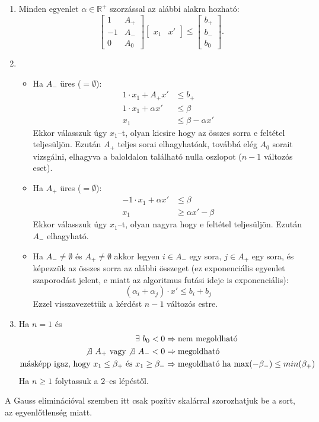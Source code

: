 \begin{enumerate}
  \item Minden egyenlet $\alpha \in \mathbb{R}^+$ szorzással az alábbi alakra
  hozható:
  \begin{displaymath}
  \begin{bmatrix}
  1  & A_+ \\
  -1 & A_- \\
  0  & A_0
  \end{bmatrix}
  \begin{bmatrix}
  x_1 & 
  x'
  \end{bmatrix}
  \leq
  \begin{bmatrix}
  b_+ \\
  b_- \\
  b_0
  \end{bmatrix}.
  \end{displaymath}
  \item 
  \begin{itemize}
  	\item Ha $A_-$ üres ($=\emptyset$): 
  	\begin{align*}
  	1 \cdot x_1 + A_+ x'     &\leq b_+ \\
  	1 \cdot x_1 + \alpha x' &\leq \beta \\
  	x_1 			  &\leq \beta - \alpha x' 
  	\end{align*} 
    Ekkor válasszuk úgy $x_1$--t, olyan kicsire hogy az összes sorra e feltétel
    teljesüljön. Ezután $A_+$ teljes sorai elhagyhatóak, továbbá elég $A_0$
    sorait vizsgálni, elhagyva a baloldalon található nulla oszlopot ($n-1$
    változós eset).
  	
  	\item Ha $A_+$ üres ($=\emptyset$): 
  	\begin{align*}
  	-1 \cdot x_1 + \alpha x'     &\leq \beta \\
  	x_1 			  &\geq \alpha x' - \beta 
  	\end{align*} 
  	Ekkor válasszuk úgy $x_1$--t, olyan nagyra hogy e feltétel teljesüljön.
  	Ezután $A_-$ elhagyható.
  	\item Ha $A_- \neq \emptyset$ és $A_+ \neq \emptyset$ akkor legyen 
  	$i \in A_-$ egy sora, $j \in A_+$ egy sora, és képezzük az összes sorra az
  	alábbi összeget (ez exponenciális egyenlet szaporodást jelent, e miatt az
  	algoritmus futási ideje is exponenciális):
  	\[
  	\left( \alpha_i + \alpha_j \right) \cdot x' \leq b_i + b_j 
  	\]
  	Ezzel visszavezettük a kérdést $n-1$ változós estre.
  \end{itemize}
 \item Ha $n=1$ és 
 \begin{align*}
 \exists~b_0 < 0 &\Rightarrow \mbox{nem megoldható} \\
 \not \exists~A_+ \mbox{ vagy} \not \exists~A_- < 0 &\Rightarrow \mbox{megoldható} \\
 \mbox{másképp igaz, hogy } x_1 \leq \beta_+ \mbox{ és } x_1 \geq \beta_-
 &\Rightarrow \mbox{megoldható ha } \mbox{max}(-\beta_-) \leq min(\beta_+)
 \end{align*} 
  Ha $n \geq 1$ folytassuk a $2$--es lépéstől.
\end{enumerate} 

A Gauss eliminációval szemben itt csak pozítiv skalárral szorozhatjuk be a sort,
az egyenlőtlenség miatt.